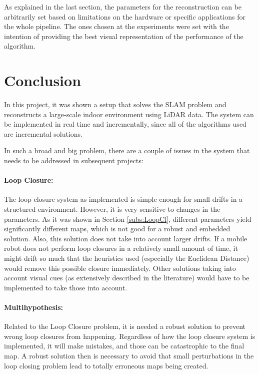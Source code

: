 \documentclass[12pt]{article}
\begin{document}
As explained in the last section, the parameters for the reconstruction can be arbitrarily set based on limitations on the hardware or specific applications for the whole pipeline. The ones chosen at the experiments were set with the intention of providing the best visual representation of the performance of the algorithm.
		
	\newpage
	\section{Conclusion}
	
In this project, it was shown a setup that solves the SLAM problem and reconstructs a large-scale indoor environment using LiDAR data. The system can be implemented in real time and incrementally, since all of the algorithms used are incremental solutions.
		
In such a broad and big problem, there are a couple of issues in the system that needs to be addressed in subsequent projects:
	
\paragraph{Loop Closure: } The loop closure system as implemented is simple enough for small drifts in a structured environment. However, it is very sensitive to changes in the parameters. As it was shown in Section \ref{subs:LoopCl}, different parameters yield significantly different maps, which is not good for a robust and embedded solution. Also, this solution does not take into account larger drifts. If a mobile robot does not perform loop closures in a relatively small amount of time, it might drift so much that the heuristics used (especially the Euclidean Distance) would remove this possible closure immediately. Other solutions taking into account visual cues (as extensively described in the literature) would have to be implemented to take those into account.
	
\paragraph{Multihypothesis: } Related to the Loop Closure problem, it is needed a robust solution to prevent wrong loop closures from happening. Regardless of how the loop closure system is implemented, it will make mistakes, and those can be catastrophic to the final map. A robust solution then is necessary to avoid that small perturbations in the loop closing problem lead to totally erroneous maps being created.
	
\end{document}
